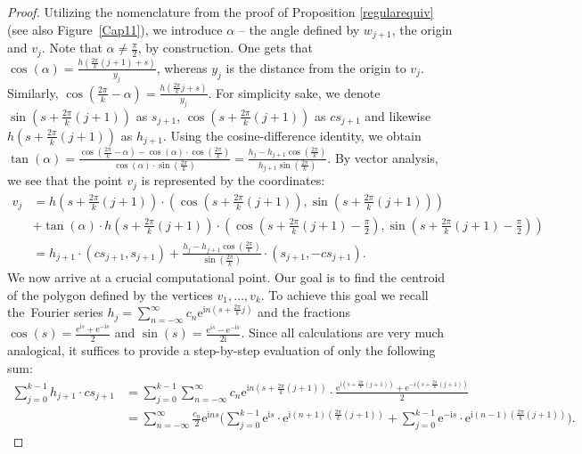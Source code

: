 \documentclass{amsart}
\theoremstyle{definition}
\numberwithin{equation}{section}
\newcommand{\e}{\mathrm{e}}
\renewcommand{\i}{\mathrm{i}}
\begin{document}
\begin{proof}
Utilizing the nomenclature from the proof of Proposition \ref{regularequiv} (see also Figure~\ref{Cap11}), we introduce $\alpha$ -- the angle defined by $w_{j+1}$, the origin and $v_j$. Note that $\alpha \neq \frac{\pi}{2}$, by construction. One gets that $\cos(\alpha)=\frac{h\left(\frac{2\pi}{k}(j+1)+s\right)}{y_j}$, whereas $y_j$ is the distance from the origin to $v_j$. Similarly, $\cos\left(\frac{2\pi}{k}-\alpha\right)=\frac{h\left(\frac{2\pi}{k}j+s\right)}{y_j}$.  For simplicity sake, we denote $\sin\left(s+\frac{2\pi}{k}(j+1)\right)$ as $s_{j+1}$, $\cos\left(s+\frac{2\pi}{k}(j+1)\right)$ as $cs_{j+1}$ and likewise $h\left(s+\frac{2\pi}{k}(j+1)\right)$ as $h_{j+1}$. Using the cosine-difference identity, we obtain $\tan(\alpha) = \frac{\cos\left(\frac{2\pi}{k}-\alpha \right)-\cos\left(\alpha\right)\cdot\cos\left(\frac{2\pi}{k}\right)}{\cos\left(\alpha\right)\cdot\sin\left(\frac{2\pi}{k}\right)} = \frac{h_j - h_{j+1}\cos\left(\frac{2\pi}{k}\right)}{h_{j+1}\sin\left(\frac{2\pi}{k}\right)}$. By vector analysis, we see that the point $v_j$ is represented by the coordinates:
\begin{align*}
v_j &= h\left(s+\frac{2\pi}{k}(j+1)\right)\cdot\left(\cos\left(s+\frac{2\pi}{k}(j+1)\right),\sin\left(s+\frac{2\pi}{k}(j+1)\right)\right) \\&+ \tan(\alpha)\cdot h\left(s+\frac{2\pi}{k}(j+1)\right)\cdot\left(\cos\left(s+\frac{2\pi}{k}(j+1) - \frac{\pi}{2}\right),\sin\left(s+\frac{2\pi}{k}(j+1)- \frac{\pi}{2}\right)\right)\\&=
h_{j+1} \cdot(cs_{j+1},s_{j+1}) + \frac{h_j - h_{j+1}\cos\left(\frac{2\pi}{k}\right)}{\sin\left(\frac{2\pi}{k}\right)}\cdot\left(s_{j+1},-cs_{j+1}\right).
\end{align*}
We now arrive at a crucial computational point. Our goal is to find the centroid of the polygon defined by the vertices $v_1,\ldots,v_k$. To achieve this goal we recall the~Fourier series $h_j = \sum_{n=-\infty}^{\infty} c_n {\e}^{\i n\left(s+\frac{2\pi}{k}j\right)}$ and the fractions $\cos(s) = \frac{{\e}^{\i s}+{\e}^{-\i s}}{2}$ and $\sin(s) = \frac{{\e}^{\i s}-{\e}^{-\i s}}{2\i }$. Since all calculations are very much analogical, it suffices to provide a step-by-step evaluation of only the following sum:
\begin{align*}
    \sum_{j=0}^{k-1}h_{j+1}\cdot cs_{j+1} &= \sum_{j=0}^{k-1}\sum_{n=-\infty}^{\infty}c_n {\e}^{\i n\left(s+\frac{2\pi}{k}(j+1)\right)}\cdot \frac{{\e}^{\i \left(s+\frac{2\pi}{k}(j+1)\right)}+{\e}^{-\i \left(s+\frac{2\pi}{k}(j+1)\right)}}{2}\\ &=\sum_{n=-\infty}^{\infty}\frac{c_n}{2}{\e}^{\i ns}\Bigg(\sum_{j=0}^{k-1}{\e}^{\i s}\cdot {\e}^{\i (n+1)\left(\frac{2\pi}{k}(j+1)\right)}+\sum_{j=0}^{k-1}{\e}^{-\i s}\cdot {\e}^{\i (n-1)\left(\frac{2\pi}{k}(j+1)\right)}\Bigg).

\end{align*}
\end{proof}
\end{document}
